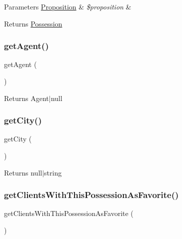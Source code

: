\begin{DoxyParams}[1]{Parameters}
\mbox{\hyperlink{class_app_1_1_entity_1_1_proposition}{Proposition}} & {\em \$proposition} & \\
\hline
\end{DoxyParams}
\begin{DoxyReturn}{Returns}
\mbox{\hyperlink{class_app_1_1_entity_1_1_possession}{Possession}} 
\end{DoxyReturn}
\mbox{\label{class_app_1_1_entity_1_1_possession_a14f9546bbf5895db0fe37673bab21850}} 
\subsubsection{\texorpdfstring{getAgent()}{getAgent()}}
{\footnotesize\ttfamily get\+Agent (\begin{DoxyParamCaption}{ }\end{DoxyParamCaption})}

\begin{DoxyReturn}{Returns}
Agent$\vert$null 
\end{DoxyReturn}
\mbox{\label{class_app_1_1_entity_1_1_possession_ae9ca906fce6e9fe5fab3a6b42209d6a1}} 
\subsubsection{\texorpdfstring{getCity()}{getCity()}}
{\footnotesize\ttfamily get\+City (\begin{DoxyParamCaption}{ }\end{DoxyParamCaption})}

\begin{DoxyReturn}{Returns}
null$\vert$string 
\end{DoxyReturn}
\mbox{\label{class_app_1_1_entity_1_1_possession_ab65280ef4246514cc54ed37b2314aaf1}} 
\subsubsection{\texorpdfstring{getClientsWithThisPossessionAsFavorite()}{getClientsWithThisPossessionAsFavorite()}}
{\footnotesize\ttfamily get\+Clients\+With\+This\+Possession\+As\+Favorite (\begin{DoxyParamCaption}{ }\end{DoxyParamCaption})}

